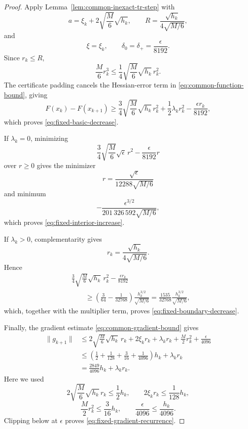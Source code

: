 \begin{proof}
Apply Lemma~\ref{lem:common-inexact-tr-step} with
\[
    a
    =
    \xi_k
    +
    2\sqrt{\frac M6}\sqrt{h_k},
    \qquad
    R
    =
    \frac{\sqrt{h_k}}{4\sqrt{M/6}},
\]
and
\[
    \xi=\xi_k,
    \qquad
    \delta_0=\delta_+
    =
    \frac{\epsilon}{8192}.
\]
Since $r_k\le R$,
\[
    \frac M6 r_k^3
    \le
    \frac14
    \sqrt{\frac M6}\sqrt{h_k}\,r_k^2.
\]
The certificate padding cancels the Hessian-error term in
\eqref{eq:common-function-bound}, giving
\[
    F(x_k)-F(x_{k+1})
    \ge
    \frac34
    \sqrt{\frac M6}\sqrt{h_k}\,r_k^2
    +
    \frac12\lambda_kr_k^2
    -
    \frac{\epsilon r_k}{8192},
\]
which proves \eqref{eq:fixed-basic-decrease}.

If $\lambda_k=0$, minimizing
\[
    \frac34\sqrt{\frac M6}\sqrt\epsilon\,r^2
    -
    \frac{\epsilon}{8192}r
\]
over $r\ge0$ gives the minimizer
\[
    r
    =
    \frac{\sqrt\epsilon}
         {12288\sqrt{M/6}}
\]
and minimum
\[
    -
    \frac{
        \epsilon^{3/2}
    }{
        201\,326\,592\sqrt{M/6}
    },
\]
which proves \eqref{eq:fixed-interior-increase}.

If $\lambda_k>0$, complementarity gives
\[
    r_k
    =
    \frac{\sqrt{h_k}}
         {4\sqrt{M/6}}.
\]
Hence
\begin{align*}
    &
    \frac34
    \sqrt{\frac M6}\sqrt{h_k}\,r_k^2
    -
    \frac{\epsilon r_k}{8192}
    \\
    &\qquad\ge
    \left(
        \frac3{64}
        -
        \frac1{32768}
    \right)
    \frac{h_k^{3/2}}{\sqrt{M/6}}
    =
    \frac{1535}{32768}
    \frac{h_k^{3/2}}{\sqrt{M/6}},
\end{align*}
which, together with the multiplier term, proves
\eqref{eq:fixed-boundary-decrease}.

Finally, the gradient estimate
\eqref{eq:common-gradient-bound} gives
\begin{align*}
    \|g_{k+1}\|
    &\le
    2\sqrt{\frac M6}\sqrt{h_k}\,r_k
    +
    2\xi_kr_k
    +
    \lambda_kr_k
    +
    \frac M2r_k^2
    +
    \frac{\epsilon}{4096}
    \\
    &\le
    \left(
        \frac12
        +
        \frac1{128}
        +
        \frac3{16}
        +
        \frac1{4096}
    \right)h_k
    +
    \lambda_kr_k
    \\
    &=
    \frac{2849}{4096}h_k+\lambda_kr_k.
\end{align*}
Here we used
\[
    2\sqrt{\frac M6}\sqrt{h_k}\,r_k
    \le
    \frac12h_k,
    \qquad
    2\xi_kr_k
    \le
    \frac1{128}h_k,
\]
\[
    \frac M2r_k^2
    \le
    \frac3{16}h_k,
    \qquad
    \frac{\epsilon}{4096}
    \le
    \frac{h_k}{4096}.
\]
Clipping below at $\epsilon$ proves
\eqref{eq:fixed-gradient-recurrence}.
\end{proof}

